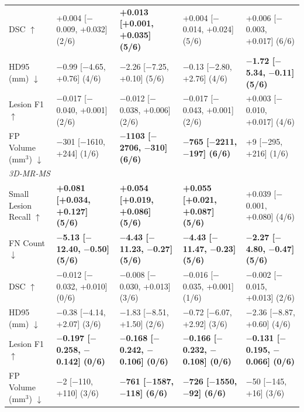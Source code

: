\begin{table}[t]
{\begin{tabular}{lllll}
DSC $\uparrow$ & +0.004 [$-$0.009, +0.032] (2/6) & \textbf{+0.013 [+0.001, +0.035] (5/6)} & +0.004 [$-$0.014, +0.024] (5/6) & +0.006 [$-$0.003, +0.017] (6/6) \\
HD95 (mm) $\downarrow$ & $-$0.99 [$-$4.65, +0.76] (4/6) & $-$2.26 [$-$7.25, +0.10] (5/6) & $-$0.13 [$-$2.80, +2.76] (4/6) & \textbf{$-$1.72 [$-$5.34, $-$0.11] (5/6)} \\
Lesion F1 $\uparrow$ & $-$0.017 [$-$0.040, +0.001] (2/6) & $-$0.012 [$-$0.038, +0.006] (2/6) & $-$0.017 [$-$0.043, +0.001] (2/6) & +0.003 [$-$0.010, +0.017] (4/6) \\
FP Volume (mm$^3$) $\downarrow$ & $-$301 [$-$1610, +244] (1/6) & \textbf{$-$1103 [$-$2706, $-$310] (6/6)} & \textbf{$-$765 [$-$2211, $-$197] (6/6)} & +9 [$-$295, +216] (1/6) \\
\midrule
\multicolumn{5}{l}{\emph{3D-MR-MS}} \\
Small Lesion Recall $\uparrow$ & \textbf{+0.081 [+0.034, +0.127] (5/6)} & \textbf{+0.054 [+0.019, +0.086] (5/6)} & \textbf{+0.055 [+0.021, +0.087] (5/6)} & +0.039 [$-$0.001, +0.080] (4/6) \\
FN Count $\downarrow$ & \textbf{$-$5.13 [$-$12.40, $-$0.50] (5/6)} & \textbf{$-$4.43 [$-$11.23, $-$0.27] (5/6)} & \textbf{$-$4.43 [$-$11.47, $-$0.23] (5/6)} & \textbf{$-$2.27 [$-$4.80, $-$0.47] (5/6)} \\
DSC $\uparrow$ & $-$0.012 [$-$0.032, +0.010] (0/6) & $-$0.008 [$-$0.030, +0.013] (3/6) & $-$0.016 [$-$0.035, +0.001] (1/6) & $-$0.002 [$-$0.015, +0.013] (2/6) \\
HD95 (mm) $\downarrow$ & $-$0.38 [$-$4.14, +2.07] (3/6) & $-$1.83 [$-$8.51, +1.50] (2/6) & $-$0.72 [$-$6.07, +2.92] (3/6) & $-$2.36 [$-$8.87, +0.60] (4/6) \\
Lesion F1 $\uparrow$ & \textbf{$-$0.197 [$-$0.258, $-$0.142] (0/6)} & \textbf{$-$0.168 [$-$0.242, $-$0.106] (0/6)} & \textbf{$-$0.166 [$-$0.232, $-$0.108] (0/6)} & \textbf{$-$0.131 [$-$0.195, $-$0.066] (0/6)} \\
FP Volume (mm$^3$) $\downarrow$ & $-$2 [$-$110, +110] (3/6) & \textbf{$-$761 [$-$1587, $-$118] (6/6)} & \textbf{$-$726 [$-$1550, $-$92] (6/6)} & $-$50 [$-$145, +16] (3/6) \\
\bottomrule
\end{tabular}%
}
\end{table}

